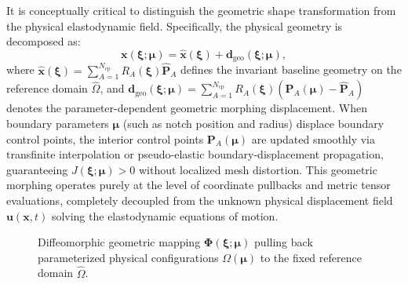 It is conceptually critical to distinguish the geometric shape transformation from the physical elastodynamic field. Specifically, the physical geometry is decomposed as:
\begin{equation}
    \bm{x}(\bm{\xi}; \bm{\mu}) = \hat{\bm{x}}(\bm{\xi}) + \bm{d}_{\text{geo}}(\bm{\xi}; \bm{\mu}),
\end{equation}
where $\hat{\bm{x}}(\bm{\xi}) = \sum_{A=1}^{N_{\text{cp}}} R_A(\bm{\xi}) \hat{\bm{P}}_A$ defines the invariant baseline geometry on the reference domain $\hat{\Omega}$, and $\bm{d}_{\text{geo}}(\bm{\xi}; \bm{\mu}) = \sum_{A=1}^{N_{\text{cp}}} R_A(\bm{\xi}) (\bm{P}_A(\bm{\mu}) - \hat{\bm{P}}_A)$ denotes the parameter-dependent geometric morphing displacement. When boundary parameters $\bm{\mu}$ (such as notch position and radius) displace boundary control points, the interior control points $\bm{P}_A(\bm{\mu})$ are updated smoothly via transfinite interpolation or pseudo-elastic boundary-displacement propagation, guaranteeing $J(\bm{\xi}; \bm{\mu}) > 0$ without localized mesh distortion. This geometric morphing operates purely at the level of coordinate pullbacks and metric tensor evaluations, completely decoupled from the unknown physical displacement field $\bm{u}(\bm{x}, t)$ solving the elastodynamic equations of motion.

\begin{figure}[htbp]
\centering
{}
\caption{Diffeomorphic geometric mapping $\bm{\Phi}(\bm{\xi}; \bm{\mu})$ pulling back parameterized physical configurations $\Omega(\bm{\mu})$ to the fixed reference domain $\hat{\Omega}$.}
\label{fig:ref_mapping_schematic}
\end{figure}

